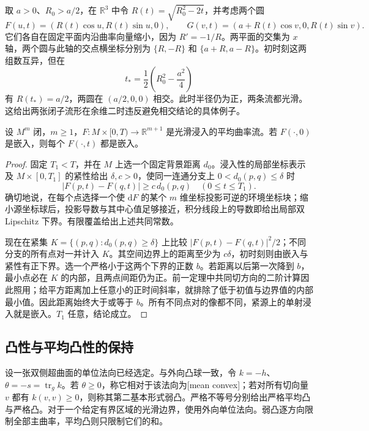 \begin{example}\label{g3:exm:mcf-higher-codimension-intersection}
	取 \(a>0\)、\(R_0>a/2\)，在 \(\mathbb R^3\) 中令 \(R(t)=\sqrt{R_0^2-2t}\)，并考虑两个圆
	\[
		F(u,t)=(R(t)\cos u,R(t)\sin u,0),\qquad
		G(v,t)=(a+R(t)\cos v,0,R(t)\sin v).
	\]
	它们各自在固定平面内沿曲率向量缩小，因为 \(R'=-1/R\)。两平面的交集为 \(x\) 轴，两个圆与此轴的交点横坐标分别为 \(\{R,-R\}\) 和 \(\{a+R,a-R\}\)。初时刻这两组数互异，但在
	\[
		t_*=\frac12\left(R_0^2-\frac{a^2}{4}\right)
	\]
	有 \(R(t_*)=a/2\)，两圆在 \((a/2,0,0)\) 相交。此时半径仍为正，两条流都光滑。这给出两张闭子流形在余维二时违反避免相交结论的具体例子。
\end{example}

\begin{corollary}\label{g3:cor:mcf-preserves-embeddedness}
	设 \(M^m\) 闭，\(m\ge1\)，\(F:M\times[0,T)\to\mathbb R^{m+1}\) 是光滑浸入的平均曲率流。若 \(F(\cdot,0)\) 是嵌入，则每个 \(F(\cdot,t)\) 都是嵌入。
\end{corollary}
\begin{proof}
	固定 \(T_1<T\)，并在 \(M\) 上选一个固定背景距离 \(d_0\)。浸入性的局部坐标表示及 \(M\times[0,T_1]\) 的紧性给出 \(\delta,c>0\)，使同一连通分支上 \(0<d_0(p,q)\le\delta\) 时
	\[
		|F(p,t)-F(q,t)|\ge c\,d_0(p,q)
		\quad(0\le t\le T_1).
	\]
	确切地说，在每个点选择一个使 \(\mathrm dF\) 的某个 \(m\) 维坐标投影可逆的环境坐标块；缩小源坐标球后，投影导数与其中心值足够接近，积分线段上的导数即给出局部双 Lipschitz 下界。有限覆盖给出上述共同常数。

	现在在紧集 \(K=\{(p,q):d_0(p,q)\ge\delta\}\) 上比较 \(|F(p,t)-F(q,t)|^2/2\)；不同分支的所有点对一并计入 \(K\)。其空间边界上的距离至少为 \(c\delta\)，初时刻则由嵌入与紧性有正下界。选一个严格小于这两个下界的正数 \(b\)。若距离以后第一次降到 \(b\)，最小点必在 \(K\) 的内部，且两点间距仍为正。前一定理中共同切方向的二阶计算因此照用；给平方距离加上任意小的正时间斜率，就排除了低于初值与边界值的内部最小值。因此距离始终大于或等于 \(b\)。所有不同点对的像都不同，紧源上的单射浸入就是嵌入。\(T_1\) 任意，结论成立。
\end{proof}

\subsection{凸性与平均凸性的保持}
\label{g3:subsec:2802:03}
设一张双侧超曲面的单位法向已经选定。与外向凸球一致，令 \(k=-h\)、\(\theta=-s=\operatorname{tr}_g k\)。若 \(\theta\ge0\)，称它相对于该法向为[mean convex]；若对所有切向量 \(v\) 都有 \(k(v,v)\ge0\)，则称其第二基本形式弱凸。严格不等号分别给出严格平均凸与严格凸。对于一个给定有界区域的光滑边界，使用外向单位法向。弱凸逐方向限制全部主曲率，平均凸则只限制它们的和。

